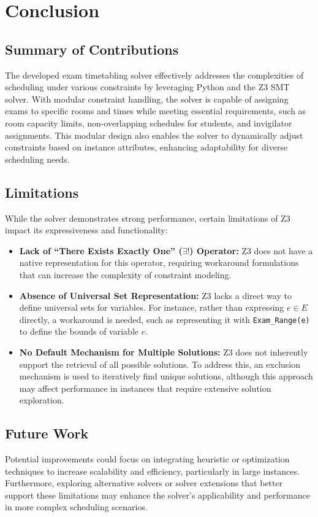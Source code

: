 \documentclass[a4paper]{article}
\begin{document}
    \section{Conclusion}

    \subsection{Summary of Contributions}
    The developed exam timetabling solver effectively addresses the complexities of scheduling under various constraints by leveraging Python and the Z3 SMT solver. With modular constraint handling, the solver is capable of assigning exams to specific rooms and times while meeting essential requirements, such as room capacity limits, non-overlapping schedules for students, and invigilator assignments. This modular design also enables the solver to dynamically adjust constraints based on instance attributes, enhancing adaptability for diverse scheduling needs.
    
    \subsection{Limitations}
    While the solver demonstrates strong performance, certain limitations of Z3 impact its expressiveness and functionality:
    \begin{itemize}
        \item \textbf{Lack of “There Exists Exactly One” (\(\exists!\)) Operator:} Z3 does not have a native representation for this operator, requiring workaround formulations that can increase the complexity of constraint modeling.
        \item \textbf{Absence of Universal Set Representation:} Z3 lacks a direct way to define universal sets for variables. For instance, rather than expressing \(e \in E\) directly, a workaround is needed, such as representing it with \texttt{Exam\_Range(e)} to define the bounds of variable \(e\).
        \item \textbf{No Default Mechanism for Multiple Solutions:} Z3 does not inherently support the retrieval of all possible solutions. To address this, an exclusion mechanism is used to iteratively find unique solutions, although this approach may affect performance in instances that require extensive solution exploration.
    \end{itemize}
    
    \subsection{Future Work}
    Potential improvements could focus on integrating heuristic or optimization techniques to increase scalability and efficiency, particularly in large instances. Furthermore, exploring alternative solvers or solver extensions that better support these limitations may enhance the solver’s applicability and performance in more complex scheduling scenarios.
    
\end{document}
